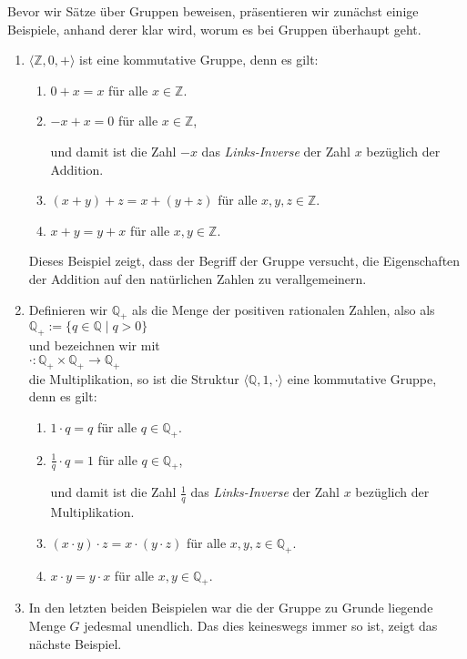 \examples
Bevor wir S\"{a}tze \"{u}ber Gruppen beweisen, pr\"{a}sentieren wir zun\"{a}chst einige Beispiele, anhand
derer klar wird, worum es bei Gruppen \"{u}berhaupt geht.
\begin{enumerate}
\item $\langle \mathbb{Z}, 0, + \rangle$ ist eine kommutative Gruppe, denn es gilt:
      \begin{enumerate}
      \item $0 + x = x$ \quad f\"{u}r alle $x \in \mathbb{Z}$.
      \item $-x + x = 0$ \quad f\"{u}r alle $x \in \mathbb{Z}$,
        
            und damit ist die Zahl $-x$ das \emph{Links-Inverse} der Zahl $x$ bez\"{u}glich
            der Addition.
      \item $(x + y) + z = x + (y + z)$ \quad f\"{u}r alle $x,y,z \in \mathbb{Z}$.
      \item $x + y = y + x$ \quad f\"{u}r alle $x,y \in \mathbb{Z}$.
      \end{enumerate}
      Dieses Beispiel zeigt, dass der Begriff der Gruppe versucht, die Eigenschaften der
      Addition auf den nat\"{u}rlichen Zahlen zu verallgemeinern.
\item Definieren wir $\mathbb{Q}_+$ als die Menge der positiven rationalen Zahlen, also als
      \\[0.2cm]
      \hspace*{1.3cm}
      $\mathbb{Q}_+ := \{ q \in \mathbb{Q} \mid q > 0 \}$
      \\[0.2cm]
      und bezeichnen wir mit
      \\[0.2cm]
      \hspace*{1.3cm}
      $\cdot : \mathbb{Q}_+ \times \mathbb{Q}_+ \rightarrow \mathbb{Q}_+$
      \\[0.2cm]
      die Multiplikation, so ist die Struktur $\langle \mathbb{Q}, 1, \cdot \rangle$ eine
      kommutative Gruppe, denn es gilt: 
      \begin{enumerate}
      \item $1 \cdot q = q$ \quad f\"{u}r alle $q \in \mathbb{Q}_+$.
      \item $\frac{1}{q} \cdot q = 1$ \quad f\"{u}r alle $q \in \mathbb{Q}_+$,
        
            und damit ist die Zahl $\frac{1}{q}$ das \emph{Links-Inverse} der Zahl $x$ bez\"{u}glich der
            Multiplikation.
      \item $(x \cdot y) \cdot z = x \cdot (y \cdot z)$ \quad f\"{u}r alle $x,y,z \in \mathbb{Q}_+$.
      \item $x \cdot y = y \cdot x$ \quad f\"{u}r alle $x,y \in \mathbb{Q}_+$.
      \end{enumerate}
\item In den letzten beiden Beispielen war die der Gruppe zu Grunde liegende Menge $G$
      jedesmal unendlich.  Das dies keineswegs immer so ist, zeigt das n\"{a}chste Beispiel.


\end{enumerate}
